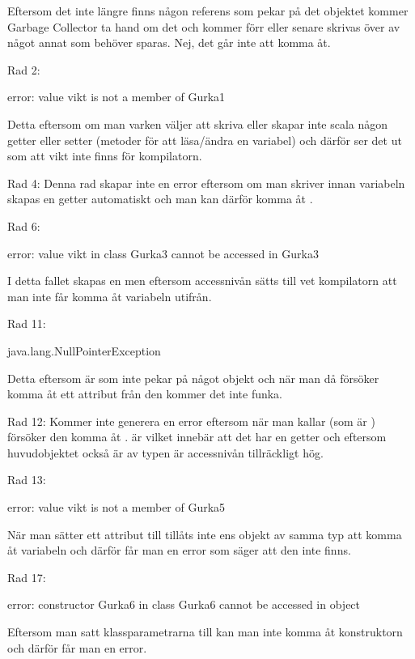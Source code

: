 \Subtask Eftersom det inte längre finns någon referens som pekar på det objektet kommer Garbage Collector ta hand om det och kommer förr eller senare skrivas över av något annat som behöver sparas. Nej, det går inte att komma åt.

\Task Rad 2:
\begin{REPL}
	error: value vikt is not a member of Gurka1
\end{REPL}
Detta eftersom om man varken väljer att skriva  eller  skapar inte scala någon getter eller setter (metoder för att läsa/ändra en variabel) och därför ser det ut som att vikt inte finns för kompilatorn.

Rad 4: Denna rad skapar inte en error eftersom om man skriver  innan variabeln skapas en getter automatiskt och man kan därför komma åt .

Rad 6:
\begin{REPL}
	error: value vikt in class Gurka3 cannot be accessed in Gurka3
\end{REPL}
I detta fallet skapas en  men eftersom accessnivån sätts till  vet kompilatorn att man inte får komma åt variabeln utifrån.

Rad 11:
\begin{REPL}
	java.lang.NullPointerException
\end{REPL}
Detta eftersom  är  som inte pekar på något objekt och när man då försöker komma åt ett attribut från den kommer det inte funka.

Rad 12: Kommer inte generera en error eftersom när man kallar  (som är ) försöker den komma åt .  är  vilket innebär att det har en getter och eftersom huvudobjektet också är av typen  är accessnivån tillräckligt hög.

Rad 13:
\begin{REPL}
	error: value vikt is not a member of Gurka5
\end{REPL}
När man sätter ett attribut till  tillåts inte ens objekt av samma typ att komma åt variabeln och därför får man en error som säger att den inte finns.

Rad 17:
\begin{REPL}
	error: constructor Gurka6 in class Gurka6 cannot be accessed in object
\end{REPL}
Eftersom man satt klassparametrarna till  kan man inte komma åt konstruktorn och därför får man en error.

